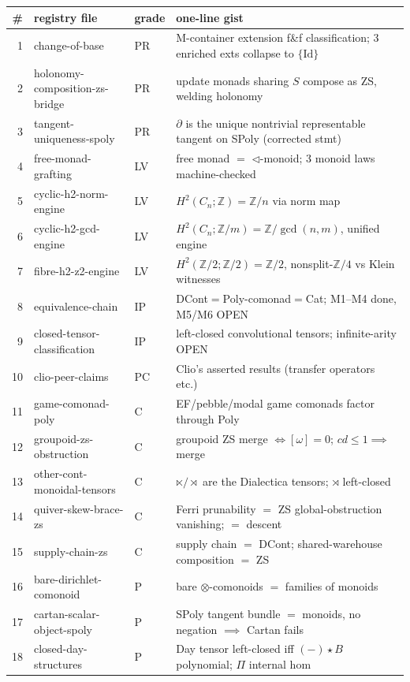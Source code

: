 \documentclass[11pt]{article}
\begin{document}
{\small
\begin{center}
\begin{tabular}{@{}rllp{6.2cm}@{}}
\hline
\# & registry file & grade & one-line gist \\
\hline
1 & change-of-base & PR & M-container extension f\&f classification; 3 enriched exts collapse to $\{\mathrm{Id}\}$ \\
2 & holonomy-composition-zs-bridge & PR & update monads sharing $S$ compose as ZS, welding holonomy \\
3 & tangent-uniqueness-spoly & PR & $∂$ is the unique nontrivial representable tangent on SPoly (corrected stmt) \\
4 & free-monad-grafting & LV & free monad $=$ $\triangleleft$-monoid; 3 monoid laws machine-checked \\
5 & cyclic-h2-norm-engine & LV & $H^2(C_n;ℤ)=ℤ/n$ via norm map \\
6 & cyclic-h2-gcd-engine & LV & $H^2(C_n;ℤ/m)=ℤ/\gcd(n,m)$, unified engine \\
7 & fibre-h2-z2-engine & LV & $H^2(ℤ/2;ℤ/2)=ℤ/2$, nonsplit-$ℤ/4$ vs Klein witnesses \\
8 & equivalence-chain & IP & DCont$=$Poly-comonad$=$Cat; M1--M4 done, M5/M6 OPEN \\
9 & closed-tensor-classification & IP & left-closed convolutional tensors; infinite-arity OPEN \\
10 & clio-peer-claims & PC & Clio's asserted results (transfer operators etc.) \\
11 & game-comonad-poly & C & EF/pebble/modal game comonads factor through Poly \\
12 & groupoid-zs-obstruction & C & groupoid ZS merge $\iff[ω]=0$; $cd\leq1\implies$ merge \\
13 & other-cont-monoidal-tensors & C & $⋉/⋊$ are the Dialectica tensors; $⋊$ left-closed \\
14 & quiver-skew-brace-zs & C & Ferri prunability $=$ ZS global-obstruction vanishing; $=$ descent \\
15 & supply-chain-zs & C & supply chain $=$ DCont; shared-warehouse composition $=$ ZS \\
16 & bare-dirichlet-comonoid & P & bare $\otimes$-comonoids $=$ families of monoids \\
17 & cartan-scalar-object-spoly & P & SPoly tangent bundle $=$ monoids, no negation $\implies$ Cartan fails \\
18 & closed-day-structures & P & Day tensor left-closed iff $(-)⋆B$ polynomial; $Π$ internal hom \\

\end{tabular}
\end{center}}
\end{document}
